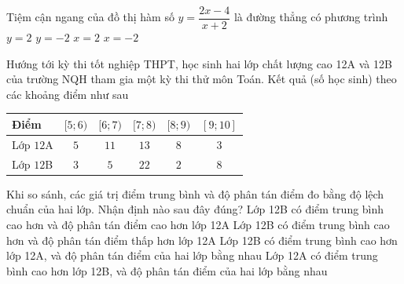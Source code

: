\begin{ex}%
	Tiệm cận ngang của đồ thị hàm số $y = \dfrac{2x-4}{x+2}$ là đường thẳng có phương trình
	\choice
	{\True $y = 2$}
	{$y = -2$}
	{$x = 2$}
	{$x = -2$}
\end{ex}
\begin{ex}%
	Hướng tới kỳ thi tốt nghiệp THPT, học sinh hai lớp chất lượng cao 12A và 12B của trường NQH tham gia một kỳ thi thử môn Toán. Kết quả (số học sinh) theo các khoảng điểm như sau
	\begin{center}
		\begin{tabular}{|l|c|c|c|c|c|}
			\hline
			Điểm & $[5; 6)$ & $[6; 7)$ & $[7; 8)$ & $[8; 9)$ & $[9; 10]$ \\ \hline
			Lớp $12$A& $5$ & $11$ & $13$ & $8$ & $3$ \\ \hline
			Lớp $12$B & $3$ & $5$ & $22$ & $2$ & $8$ \\ \hline
		\end{tabular}
	\end{center}
	Khi so sánh, các giá trị điểm trung bình và độ phân tán điểm đo bằng độ lệch chuẩn của hai lớp. Nhận định nào sau đây đúng?
	\choice
	{Lớp 12B có điểm trung bình cao hơn và độ phân tán điểm cao hơn lớp 12A}
	{Lớp 12B có điểm trung bình cao hơn và độ phân tán điểm thấp hơn lớp 12A}
	{\True Lớp 12B có điểm trung bình cao hơn lớp 12A, và độ phân tán điểm của hai lớp bằng nhau}
	{Lớp 12A có điểm trung bình cao hơn lớp 12B, và độ phân tán điểm của hai lớp bằng nhau}
	\loigiai{
		\begin{center}
			\begin{tabular}{|l|c|c|c|c|c|}
				\hline
				Điểm & $[5; 6)$ & $[6; 7)$ & $[7; 8)$ & $[8; 9)$ & $[9; 10]$ \\
				\hline
				Giá trị đại diện&$5{,}5$ & $6{,}5$ & $7{,}5$ & $8{,}5$ & $9{,}5$ \\ \hline
				Lớp $12$A& $5$ & $11$ & $13$ & $8$ & $3$ \\ \hline
				Lớp $12$B & $3$ & $5$ & $22$ & $2$ & $8$ \\ \hline
			\end{tabular}
		\end{center}
		\begin{itemize}

\end{itemize}}
\end{ex}
